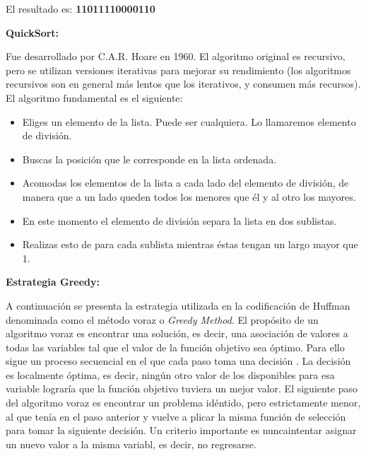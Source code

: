 \documentclass[12pt,twoside]{article}
\begin{document}
El resultado es: \textbf{11011110000110\\}




\newpage
\textbf{\newline QuickSort:\newline }

Fue desarrollado por C.A.R. Hoare en 1960. El algoritmo original es recursivo, pero se utilizan versiones iterativas para mejorar su rendimiento (los algoritmos recursivos son en general más lentos que los iterativos, y consumen más recursos). El algoritmo fundamental es el siguiente:

\begin{itemize}
    \item Eliges un elemento de la lista. Puede ser cualquiera. Lo llamaremos elemento de divisi\'on.
    \item Buscas la posici\'on que le corresponde en la lista ordenada.
    \item Acomodas los elementos de la lista a cada lado del elemento de divisi\'on, de manera que a un lado queden todos los menores que \'el y al otro los mayores.
    \item En este momento el elemento de divisi\'on separa la lista en dos sublistas.
    \item Realizas esto de para cada sublista mientras éstas tengan un largo mayor que 1.
\end{itemize}



\newpage
\textbf{\newline Estrategia Greedy:\newline } 

A continuaci\'on se presenta la estrategia utilizada en la codificaci\'on de Huffman denominada como el m\'etodo voraz o \textit{Greedy Method}. El prop\'osito de un algoritmo voraz es encontrar una soluci\'on, es decir, una asociaci\'on de valores a todas las variables tal que el valor de la funci\'on objetivo sea \'optimo. Para ello sigue un proceso secuencial en el que cada paso toma una decisi\'on . \newline \newline La decisi\'on es localmente \'optima, es decir, ning\'un otro valor de los disponibles para esa variable lograr\'ia  que la funci\'on objetivo tuviera un mejor valor. \newline \newline El siguiente paso del algoritmo voraz es encontrar un problema id\'entido, pero estrictamente menor, al que ten\'ia en el paso anterior y vuelve a plicar la misma funci\'on de selecci\'on para tomar la siguiente decisi\'on. Un criterio importante es nuncaintentar asignar un nuevo valor a la misma variabl, es decir, no regresarse.
\end{document}
